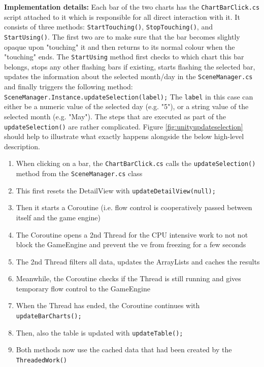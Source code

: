 \textbf{Implementation details:} Each bar of the two charts has the \texttt{ChartBarClick.cs} script attached to it which is responsible for all direct interaction with it. It consists of three methods: \texttt{StartTouching()}, \texttt{StopTouching()}, and \texttt{StartUsing()}. The first two are to make sure that the bar becomes slightly opaque upon "touching" it and then returns to its normal colour when the "touching" ends. The \texttt{StartUsing} method first checks to which chart this bar belongs, stops any other flashing bars if existing, starts flashing the selected bar, updates the information about the selected month/day in the \texttt{SceneManager.cs} and finally triggers the following method: \newline
\texttt{SceneManager.Instance.updateSelection(label);} The \texttt{label} in this case can either be a numeric value of the selected day (e.g. "5"), or a string value of the selected month (e.g. "May"). The steps that are executed as part of the \texttt{updateSelection()} are rather complicated. Figure \ref{fig:unityupdateselection} should help to illustrate what exactly happens alongside the below high-level description.
\begin{enumerate}
	\item When clicking on a bar, the \texttt{ChartBarClick.cs} calls the \texttt{updateSelection()} method from the \texttt{SceneManager.cs} class
	\item This first resets the DetailView with \texttt{updateDetailView(null);}
	\item Then it starts a Coroutine (i.e. flow control is cooperatively passed between itself and the game engine)
	\item The Coroutine opens a 2nd Thread for the CPU intensive work to not not block the GameEngine and prevent the \gls{ve} from freezing for a few seconds
	\item The 2nd Thread filters all data, updates the ArrayLists and caches the results
	\item Meanwhile, the Coroutine checks if the Thread is still running and gives temporary flow control to the GameEngine
	\item When the Thread has ended, the Coroutine continues with \texttt{updateBarCharts();}
	\item Then, also the table is updated with \texttt{updateTable();}
	\item Both methods now use the cached data that had been created by the \texttt{ThreadedWork()}
\end{enumerate}

